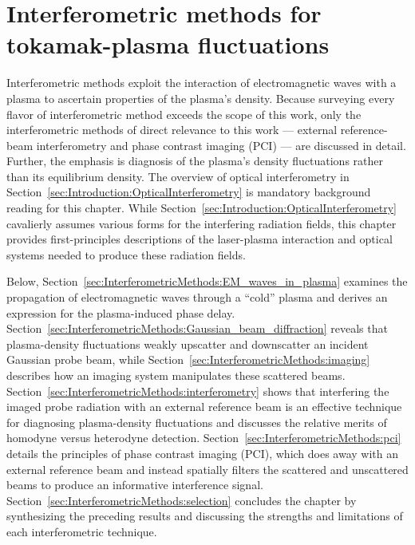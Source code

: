 \chapter{Interferometric methods for tokamak-plasma fluctuations}
\label{ch:InterferometricMethods}
Interferometric methods exploit the interaction of
electromagnetic waves with a plasma
to ascertain properties of the plasma's density.
Because surveying every flavor of interferometric method
exceeds the scope of this work,
only the interferometric methods
of direct relevance to this work ---
external reference-beam interferometry and phase contrast imaging (PCI) ---
are discussed in detail.
Further, the emphasis is diagnosis of the plasma's density fluctuations
rather than its equilibrium density.
The overview of optical interferometry in
Section~\ref{sec:Introduction:OpticalInterferometry}
is mandatory background reading for this chapter.
While Section~\ref{sec:Introduction:OpticalInterferometry}
cavalierly assumes various forms for the interfering radiation fields,
this chapter provides first-principles descriptions
of the laser-plasma interaction and optical systems needed
to produce these radiation fields.

Below, Section~\ref{sec:InterferometricMethods:EM_waves_in_plasma}
examines the propagation of electromagnetic waves through a ``cold'' plasma
and derives an expression for the plasma-induced phase delay.
Section~\ref{sec:InterferometricMethods:Gaussian_beam_diffraction} reveals that
plasma-density fluctuations weakly upscatter and downscatter
an incident Gaussian probe beam, while
Section~\ref{sec:InterferometricMethods:imaging} describes
how an imaging system manipulates these scattered beams.
Section~\ref{sec:InterferometricMethods:interferometry} shows that
interfering the imaged probe radiation with an external reference beam
is an effective technique for diagnosing plasma-density fluctuations and
discusses the relative merits of homodyne versus heterodyne detection.
Section~\ref{sec:InterferometricMethods:pci} details the principles of
phase contrast imaging (PCI),
which does away with an external reference beam and
instead spatially filters the scattered and unscattered beams
to produce an informative interference signal.
Section~\ref{sec:InterferometricMethods:selection}
concludes the chapter by synthesizing the preceding results and
discussing the strengths and limitations of each interferometric technique.


